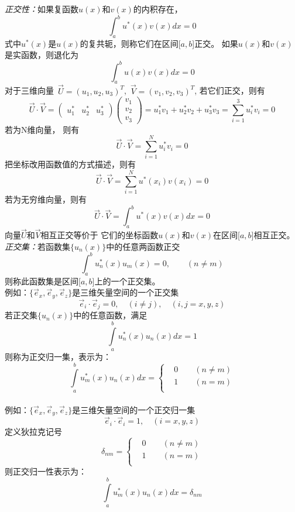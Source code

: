 \emph{正交性：}如果复函数$u(x)$和$v(x)$的内积存在，
$$ \int_a^b u^* (x) v(x) dx = 0$$
式中$u^* (x)$是$u(x)$的复共轭，则称它们在区间[$a,b$]正交。
如果$u(x)$和$v(x)$是实函数，则退化为 
$$ \int_a^b u (x) v(x) dx = 0$$
对于三维向量~$\vec{U} = (u_1, u_2, u_3 )^T$,~$\vec{V} = (v_1, v_2, v_3 )^T$, 若它们正交，则有
  \[ \vec{U} \cdot \vec{V} = \begin{pmatrix} u^*_1 & u^*_2 & u^*_3 \end{pmatrix} \begin{pmatrix} v_1 \\ v_2 \\ v_3 \end{pmatrix} =
  u^*_1 v_1 + u^*_2 v_2 + u^*_3 v_3  = \sum_{i=1}^{3} u^*_i v_i = 0\]
  若为N维向量， 则有
  \[ \vec{U} \cdot \vec{V} = \sum_{i=1}^{N} u^*_i v_i = 0\]
  把坐标改用函数值的方式描述，则有
  \[ \vec{U} \cdot \vec{V} = \sum_{i=1}^{N} u^*(x_i) v(x_i) = 0\]
  若为无穷维向量，则有
	\[\vec{U} \cdot \vec{V} = \int_{a}^{b}u^*(x) v(x)dx = 0\]
	向量$\vec{U}$和$\vec{V}$相互正交等价于 
	它们的坐标函数$u(x)$和$v(x)$在区间[$a,b$]相互正交。\\

\emph{正交集：}若函数集$\{ u_n (x)\}$中的任意两函数正交
$$ \int_a^b u_n^* (x) u_m(x) = 0, \qquad (n \ne m)$$
则称此函数集是区间[$a,b$]上的一个正交集。\\
例如：$\{\vec{e}_x, \vec{e}_y, \vec{e}_z\}$是三维矢量空间的一个正交集
\[ \vec{e}_i \cdot \vec{e}_j =0, \quad (i\ne j), \quad (i,j =x,y,z) \]
若正交集$\{ u_n (x)\}$中的任意函数，满足
  $$ \int\limits_a ^b u_n^* (x) u_n (x) dx =1 $$
则称为正交归一集，表示为：\\
  $$
  \int\limits_a ^b u_m^* (x) u_n (x) dx = 
  \left \{ 
  \begin{aligned}
  &0 \qquad (n \ne m) \\
  &1 \qquad (n = m) \\
  \end{aligned} \right.
  $$
  ~~\\ 
例如：$\{\vec{e}_x, \vec{e}_y, \vec{e}_z\}$是三维矢量空间的一个正交归一集
\[ \vec{e}_i \cdot \vec{e}_i =1, \quad (i=x,y,z) \]
定义狄拉克记号
$$
\delta _{nm} = 
\left \{ 
\begin{aligned}
&0 \qquad (n \ne m) \\
&1 \qquad (n = m) \\
\end{aligned} \right.
$$
则正交归一性表示为：
$$
\int\limits_a ^b u_m^* (x) u_n (x) dx = \delta _{nm}
$$


